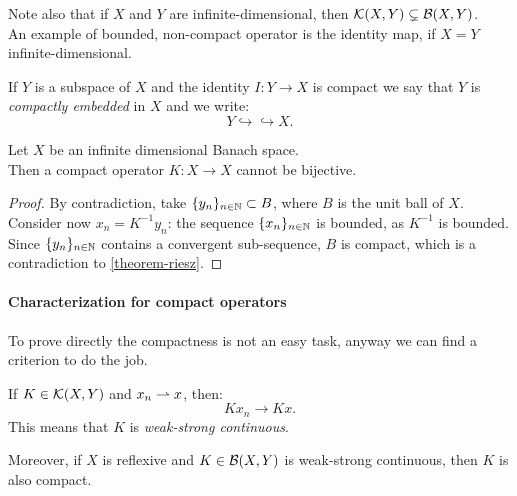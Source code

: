 Note also that if $X$ and $Y$ are infinite-dimensional, then $\mathcal K(X,Y) \subsetneq \mathcal B(X,Y)$. \\ 
An example of bounded, non-compact operator is the identity map, if $X=Y$ infinite-dimensional.


\begin{defn}
	If $Y$ is a subspace of $X$ and the identity $I : Y \to X$ is compact we say that $Y$ is \emph{compactly embedded} in $X$ and we write: $$Y \hookrightarrow\hookrightarrow X.$$
\end{defn}

\begin{prop}
	Let $X$ be an infinite dimensional Banach space.\\
	Then a compact operator $K:X \to X$ cannot be bijective.
\end{prop}

\begin{proof}
	By contradiction, take $\{y_n\}_{n \in \mathbb N} \subset B$, where $B$ is the unit ball of $X$.\\
	Consider now $x_n = K^{-1} y_n$: the sequence $\{x_n\}_{n \in \mathbb N}$ is bounded, as $K^{-1}$ is bounded.\\
	Since $\{y_n\}_{n \in \mathbb N}$ contains a convergent sub-sequence, $B$ is compact, which is a contradiction to \vref{theorem-riesz}.
\end{proof}


\paragraph{Characterization for compact operators} To prove directly the compactness is not an easy task, anyway we can find a criterion to do the job.

\begin{theo} \label{theo-compact-charact}
	If $K \in \mathcal K(X,Y)$ and $x_n \rightharpoonup  x$, then: $$ K x_n \to Kx.$$
	This means that $K$ is \emph{weak-strong continuous}.
	
	Moreover, if $X$ is reflexive and $K \in \mathcal B(X,Y)$ is weak-strong continuous, then $K$ is also compact.
\end{theo}


